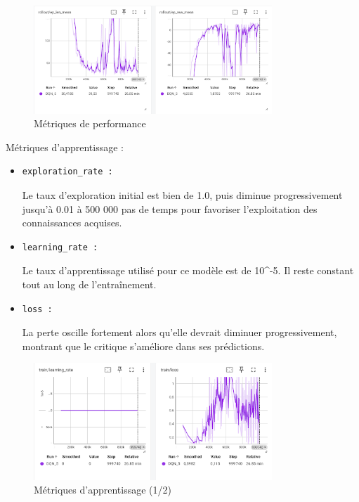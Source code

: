 \documentclass{article}
\begin{document}
    \begin{figure}[ht]
        \centering
        \includegraphics[width=0.8\textwidth]{10.png}
        \caption{Métriques de performance}
    \end{figure}
    
    Métriques d'apprentissage :
    \begin{itemize} 
        \item \begin{verbatim}exploration_rate :\end{verbatim}Le taux d'exploration initial est bien de 1.0, puis diminue progressivement jusqu'à 0.01 à 500 000 pas de temps pour favoriser l'exploitation des connaissances acquises.
        \item \begin{verbatim}learning_rate :\end{verbatim}Le taux d'apprentissage utilisé pour ce modèle est de 10\^{}-5. Il reste constant tout au long de l'entraînement.
        \item \begin{verbatim}loss :\end{verbatim}La perte oscille fortement alors qu'elle devrait diminuer progressivement, montrant que le critique s'améliore dans ses prédictions.
    \end{itemize}

    \begin{figure}[ht]
        \centering
        \includegraphics[width=0.8\textwidth]{11.png}
        \caption{Métriques d'apprentissage (1/2)}
    \end{figure}
\end{document}
